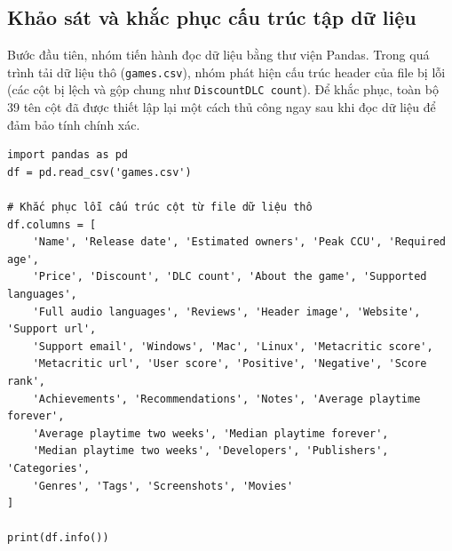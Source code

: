 \subsection{Khảo sát và khắc phục cấu trúc tập dữ liệu}
\hspace{1cm} Bước đầu tiên, nhóm tiến hành đọc dữ liệu bằng thư viện Pandas. Trong quá trình tải dữ liệu thô (\texttt{games.csv}), nhóm phát hiện cấu trúc header của file bị lỗi (các cột bị lệch và gộp chung như \texttt{DiscountDLC count}). Để khắc phục, toàn bộ 39 tên cột đã được thiết lập lại một cách thủ công ngay sau khi đọc dữ liệu để đảm bảo tính chính xác.

\begin{verbatim}
import pandas as pd
df = pd.read_csv('games.csv')

# Khắc phục lỗi cấu trúc cột từ file dữ liệu thô
df.columns = [
    'Name', 'Release date', 'Estimated owners', 'Peak CCU', 'Required age', 
    'Price', 'Discount', 'DLC count', 'About the game', 'Supported languages', 
    'Full audio languages', 'Reviews', 'Header image', 'Website', 'Support url', 
    'Support email', 'Windows', 'Mac', 'Linux', 'Metacritic score', 
    'Metacritic url', 'User score', 'Positive', 'Negative', 'Score rank', 
    'Achievements', 'Recommendations', 'Notes', 'Average playtime forever', 
    'Average playtime two weeks', 'Median playtime forever', 
    'Median playtime two weeks', 'Developers', 'Publishers', 'Categories', 
    'Genres', 'Tags', 'Screenshots', 'Movies'
]

print(df.info())
\end{verbatim}


